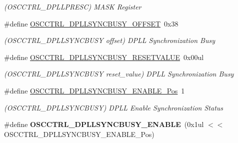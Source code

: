 \begin{DoxyCompactItemize}
\begin{DoxyCompactList}\small\item\em (O\+S\+C\+C\+T\+R\+L\+\_\+\+D\+P\+L\+L\+P\+R\+E\+S\+C) M\+A\+S\+K Register \end{DoxyCompactList}\item 
\hypertarget{group___s_a_m_l21___o_s_c_c_t_r_l_ga2c5a41f1265f4fa368dd76a5e906a6ff}{}\#define \hyperlink{group___s_a_m_l21___o_s_c_c_t_r_l_ga2c5a41f1265f4fa368dd76a5e906a6ff}{O\+S\+C\+C\+T\+R\+L\+\_\+\+D\+P\+L\+L\+S\+Y\+N\+C\+B\+U\+S\+Y\+\_\+\+O\+F\+F\+S\+E\+T}~0x38\label{group___s_a_m_l21___o_s_c_c_t_r_l_ga2c5a41f1265f4fa368dd76a5e906a6ff}

\begin{DoxyCompactList}\small\item\em (O\+S\+C\+C\+T\+R\+L\+\_\+\+D\+P\+L\+L\+S\+Y\+N\+C\+B\+U\+S\+Y offset) D\+P\+L\+L Synchronization Busy \end{DoxyCompactList}\item 
\hypertarget{group___s_a_m_l21___o_s_c_c_t_r_l_gad7e00f58be72dd69d9a2115fbe2d08bf}{}\#define \hyperlink{group___s_a_m_l21___o_s_c_c_t_r_l_gad7e00f58be72dd69d9a2115fbe2d08bf}{O\+S\+C\+C\+T\+R\+L\+\_\+\+D\+P\+L\+L\+S\+Y\+N\+C\+B\+U\+S\+Y\+\_\+\+R\+E\+S\+E\+T\+V\+A\+L\+U\+E}~0x00ul\label{group___s_a_m_l21___o_s_c_c_t_r_l_gad7e00f58be72dd69d9a2115fbe2d08bf}

\begin{DoxyCompactList}\small\item\em (O\+S\+C\+C\+T\+R\+L\+\_\+\+D\+P\+L\+L\+S\+Y\+N\+C\+B\+U\+S\+Y reset\+\_\+value) D\+P\+L\+L Synchronization Busy \end{DoxyCompactList}\item 
\hypertarget{group___s_a_m_l21___o_s_c_c_t_r_l_ga54af50bfcb6024fc8f7bb09d075c76af}{}\#define \hyperlink{group___s_a_m_l21___o_s_c_c_t_r_l_ga54af50bfcb6024fc8f7bb09d075c76af}{O\+S\+C\+C\+T\+R\+L\+\_\+\+D\+P\+L\+L\+S\+Y\+N\+C\+B\+U\+S\+Y\+\_\+\+E\+N\+A\+B\+L\+E\+\_\+\+Pos}~1\label{group___s_a_m_l21___o_s_c_c_t_r_l_ga54af50bfcb6024fc8f7bb09d075c76af}

\begin{DoxyCompactList}\small\item\em (O\+S\+C\+C\+T\+R\+L\+\_\+\+D\+P\+L\+L\+S\+Y\+N\+C\+B\+U\+S\+Y) D\+P\+L\+L Enable Synchronization Status \end{DoxyCompactList}\item 
\hypertarget{group___s_a_m_l21___o_s_c_c_t_r_l_ga04d19cfcedf149ef261f2e43c05617eb}{}\#define {\bfseries O\+S\+C\+C\+T\+R\+L\+\_\+\+D\+P\+L\+L\+S\+Y\+N\+C\+B\+U\+S\+Y\+\_\+\+E\+N\+A\+B\+L\+E}~(0x1ul $<$$<$ O\+S\+C\+C\+T\+R\+L\+\_\+\+D\+P\+L\+L\+S\+Y\+N\+C\+B\+U\+S\+Y\+\_\+\+E\+N\+A\+B\+L\+E\+\_\+\+Pos)\label{group___s_a_m_l21___o_s_c_c_t_r_l_ga04d19cfcedf149ef261f2e43c05617eb}


\end{DoxyCompactItemize}
